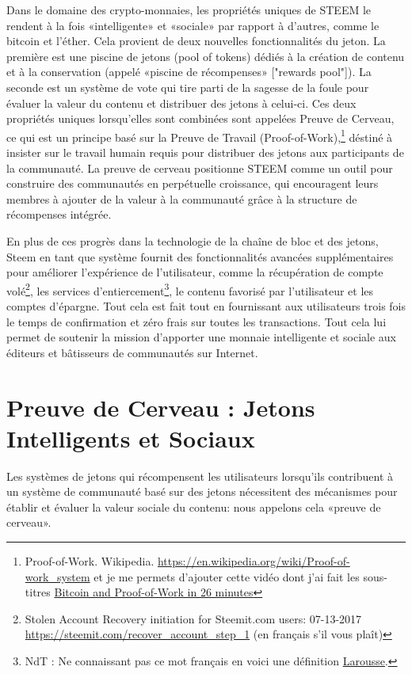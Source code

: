 \documentclass[11pt]{article}
\begin{document}
Dans le domaine des crypto-monnaies, les propriétés uniques de STEEM
le rendent à la fois «intelligente» et «sociale» par rapport à
d'autres, comme le bitcoin et l'éther. Cela provient de deux
nouvelles fonctionnalités du jeton. La première est une piscine de
jetons (pool of tokens) dédiés à la création de contenu et à la
conservation (appelé «piscine de récompenses» ["rewards pool"]). La
seconde est un système de vote qui tire parti de la sagesse de la
foule pour évaluer la valeur du contenu et distribuer des jetons à
celui-ci. Ces deux propriétés uniques lorsqu'elles sont combinées
sont appelées Preuve de Cerveau, ce qui est un principe basé sur la
Preuve de Travail (Proof-of-Work),\footnote{Proof-of-Work. Wikipedia. \url{https://en.wikipedia.org/wiki/Proof-of-work\_system}
et je me permets d'ajouter cette vidéo dont j'ai fait les sous-titres
\href{https://youtu.be/bBC-nXj3Ng4}{Bitcoin and Proof-of-Work in 26 minutes}} déstiné à insister sur le
travail humain requis pour distribuer des jetons aux participants de
la communauté. La preuve de cerveau positionne STEEM comme un outil
pour construire des communautés en perpétuelle croissance, qui
encouragent leurs membres à ajouter de la valeur à la communauté
grâce à la structure de récompenses intégrée. 

En plus de ces progrès dans la technologie de la chaîne de bloc et des jetons,
Steem en tant que système fournit des fonctionnalités avancées
supplémentaires pour améliorer l'expérience de l'utilisateur, comme
la récupération de compte volé\footnote{Stolen Account Recovery initiation for Steemit.com users:
07-13-2017 \url{https://steemit.com/recover\_account\_step\_1} (en français
s'il vous plaît)}, les services d'entiercement\footnote{NdT : Ne connaissant pas ce mot français en voici une définition \href{http://www.larousse.fr/dictionnaires/francais/entiercement/29936}{Larousse}.},
le contenu favorisé par l'utilisateur et les comptes d'épargne. Tout
cela est fait tout en fournissant aux utilisateurs trois fois le
temps de confirmation et zéro frais sur toutes les
transactions. Tout cela lui permet de soutenir la mission d'apporter
une monnaie intelligente et sociale aux éditeurs et bâtisseurs de
communautés sur Internet. 










\section{Preuve de Cerveau : Jetons Intelligents et Sociaux}
\label{sec:org10d3240}
Les systèmes de jetons qui récompensent les utilisateurs lorsqu'ils
contribuent à un système de communauté basé sur des jetons
nécessitent des mécanismes pour établir et évaluer la valeur sociale
du contenu: nous appelons cela «preuve de cerveau».
\end{document}
